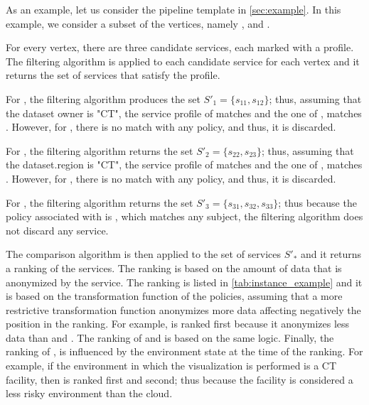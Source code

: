 \begin{example}\label{ex:instance}

  As an example, let us consider the pipeline template \tChartFunction in \cref{sec:example}.
  In this example, we consider a subset of the vertices, namely ,  and .


  For every vertex, there are three candidate services, each marked with a profile.
  The filtering algorithm is applied to each candidate service for each vertex and it returns the set of services that satisfy the profile.
  \begin{enumerate*}[label=\textit{\roman*})]
    \item For , the filtering algorithm produces the set $S'_1=\{s_{11},s_{12}\}$; thus, assuming that the dataset owner is "CT", the service profile of  matches  and the one of , matches .
          However, for , there is no match with any policy, and thus, it is discarded.
    \item For , the filtering algorithm returns the set $S'_2=\{s_{22},s_{23}\}$; thus, assuming that the dataset.region is "CT", the service profile of  matches  and the one of , matches .
          However, for , there is no match with any policy, and thus, it is discarded.
    \item For , the filtering algorithm returns the set $S'_3=\{s_{31},s_{32},s_{33}\}$;
          thus because the policy associated with  is , which matches any subject, the filtering algorithm does not discard any service.

  \end{enumerate*}

  The comparison algorithm is then applied to the set of services $S'_*$ and it returns a ranking of the services.
  The ranking is based on the amount of data that is anonymized by the service.
  The ranking is listed in \cref{tab:instance_example} and it is based on the transformation function of the policies,
  assuming that a more restrictive transformation function anonymizes more data affecting negatively the position in the ranking.
  For example,  is ranked first because it anonymizes less data than  and .
  The ranking of  and  is based on the same logic.
  Finally, the ranking of ,  is influenced by the environment state at the time of the ranking.
  For example, if the environment in which the visualization is performed is a CT facility, then  is ranked first and  second;
  thus because the facility is considered a less risky environment than the cloud.




\end{example}
